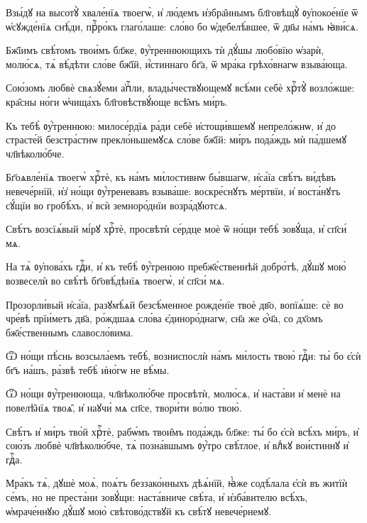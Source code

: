 \hKv Взы́дꙋ на высотꙋ̀ хвале́нїѧ твоегѡ̀, и҆ лю́демъ и҆збра̑ннымъ  бл҃говѣщꙋ̀ ᲂу҆покое́нїе ѿ ѡ҆сꙋжде́нїѧ снѣ́ди, прⷪ҇ро́къ  глаго́лаше: сло́во бо ѡ҆дебелѣ́вшее, ѿ дв҃ы на́мъ  ꙗ҆ви́сѧ. 
%

\hKv Бж҃їимъ свѣ́томъ твои́мъ бл҃же, ᲂу҆́треннюющихъ тѝ дꙋ́шы  любо́вїю ѡ҆зарѝ, молю́сѧ, тѧ̀ вѣ́дѣти сло́ве бж҃їй,  и҆́стиннаго бг҃а, ѿ мра́ка грѣхо́внагѡ взыва́юща. 
%

\hKv Сою́зомъ любвѐ свѧзꙋ́еми  а҆пⷭ҇ли, влады́чествꙋющемꙋ всѣ́ми себѐ хрⷭ҇тꙋ̀ возло́жше:  кра̑сны но́ги ѡ҆чища́хъ бл҃говѣствꙋ́юще всѣ̑мъ ми́ръ. 
%

\hKv Къ тебѣ̀ ᲂу҆́треннюю: милосе́рдїѧ  ра́ди себѐ и҆стощи́вшемꙋ непрело́жнѡ, и҆ до страсте́й  безстра́стнѡ прекло́ньшемꙋсѧ сло́ве бж҃їй: ми́ръ пода́ждь  мѝ па́дшемꙋ чл҃вѣколю́бче.  
%

\hKv Бг҃оѧвле́нїѧ твоегѡ̀ хрⷭ҇тѐ, къ  на́мъ ми́лостивнѡ бы́вшагѡ, и҆са́їа свѣ́тъ ви́дѣвъ  невече́рнїй, и҆з̾ но́щи ᲂу҆́треневавъ взыва́ше:  воскре́снꙋтъ ме́ртвїи, и҆ воста́нꙋтъ сꙋ́щїи во гробѣ́хъ, и҆  всѝ земноро́днїи возра́дꙋютсѧ. 
%

\hKv Свѣ́тъ возсїѧ́вый мі́рꙋ хрⷭ҇тѐ, просвѣтѝ се́рдце моѐ  ѿ но́щи тебѣ̀ зовꙋ́ща, и҆ сп҃си́ мѧ. 

\hKv На тѧ̀ ᲂу҆пова́хъ гдⷭ҇и, и҆ къ тебѣ̀ ᲂу҆́тренюю  пребж҃е́ственнѣй добро́тѣ, дꙋ́шꙋ мою̀ возвеселѝ во  свѣ́тѣ бг҃овѣ́дѣнїѧ твоегѡ̀, и҆ сп҃си́ мѧ. 

\hKv Прозорли́вый и҆са́їа, разꙋмѣ́ѧй безсѣ́менное рожде́нїе  твоѐ дв҃о, вопїѧ́ше: сѐ во чре́вѣ прїи́метъ дв҃а,  ро́ждшаѧ сло́ва є҆диноро́днагѡ, сн҃а же ѻ҆́ч҃а, со дх҃омъ  бж҃е́ственнымъ славосло́вима. 

\hKv Ѿ но́щи пѣ́снь возсыла́емъ тебѣ̀, возниспослѝ на́мъ  ми́лость твою̀ гдⷭ҇и: ты́ бо є҆сѝ бг҃ъ на́шъ, ра́звѣ  тебѣ̀ и҆но́гѡ не вѣ́мы.  

\hKv Ѿ но́щи ᲂу҆́тренююща, чл҃вѣколю́бче просвѣтѝ, молю́сѧ,  и҆ наста́ви и҆ менѐ на повелѣ̑нїѧ твоѧ̑, и҆ наꙋчи́ мѧ  сп҃се, твори́ти во́лю твою̀. 

\hKv Свѣ́тъ и҆ ми́ръ тво́й хрⷭ҇тѐ, рабѡ́мъ твои̑мъ пода́ждь  бл҃же: ты́ бо є҆сѝ всѣ́хъ ми́ръ, и҆ сою́зъ любвѐ  чл҃вѣколю́бче, тѧ̀ позна́вшымъ ᲂу҆́тро свѣ́тлое, и҆  влⷣкꙋ вои́стиннꙋ и҆ гдⷭ҇а. 

\hKv Мра́къ тѧ̀, дꙋшѐ моѧ̀, поѧ́тъ беззако́нныхъ дѣѧ́нїй,  ꙗ҆̀же содѣ́лала є҆сѝ въ житїѝ се́мъ, но не преста́ни  зовꙋ́щи: наста́вниче свѣ́та, и҆ и҆зба́вителю всѣ́хъ,  ѡ҆мраче́ннꙋю дꙋ́шꙋ мою̀ свѣтово́дствꙋй къ свѣ́тꙋ  невече́рнемꙋ. 

